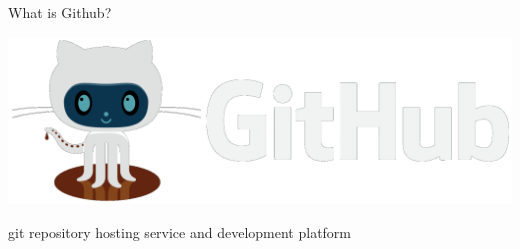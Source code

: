 \documentclass[12pt]{beamer}
\begin{document}
\begin{frame}

\end{frame}





































\begin{frame}

	\begin{flushright}
	\Large \textcolor{boss2}{What is Github?} 
	\end{flushright}

  \begin{center}
    \includegraphics[width=\textwidth]{figs/github.png}
  \end{center}

	\textcolor{boss3}{git repository hosting service and development platform}

\end{frame}
\end{document}

